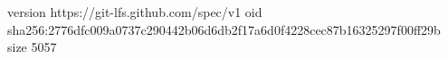 version https://git-lfs.github.com/spec/v1
oid sha256:2776dfc009a0737c290442b06d6db2f17a6d0f4228cec87b16325297f00ff29b
size 5057
